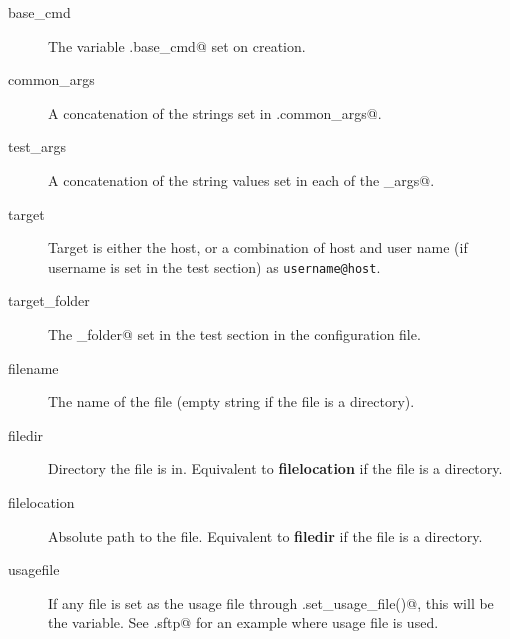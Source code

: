 \begin{description}
    \item[base\_cmd] The variable \verb@self.base_cmd@ set on creation.
    \item[common\_args] A concatenation of the strings set in
        \verb@self.common_args@.
    \item[test\_args] A concatenation of the string values set in each of the
        \verb@test_args@.
    \item[target] Target is either the host, or a combination of host and
        user name (if username is set in the test section) as
        \verb"username@host".
    \item[target\_folder] The \verb@target_folder@ set in the test section in
        the configuration file.
    \item[filename] The name of the file (empty string if the file is a
        directory).
    \item[filedir] Directory the file is in. Equivalent to
        \textbf{filelocation}  if the file is a directory.
    \item[filelocation] Absolute path to the file. Equivalent to
        \textbf{filedir} if the file is a directory.
    \item[usagefile] If any file is set as the usage file through
        \verb@FileObject.set_usage_file()@, this will be the variable. See
        \verb@testers.sftp@ for an example where usage file is used.
\end{description}
